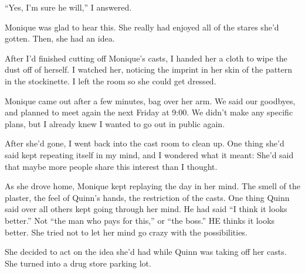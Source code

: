 ``Yes, I'm sure he will,'' I answered.

Monique was glad to hear this. She really had enjoyed all of the stares she'd gotten.
Then, she had an idea.

After I'd finished cutting off Monique's casts, I handed her a cloth to wipe the dust off
of herself. I watched her, noticing the imprint in her skin of the pattern in the stockinette. I
left the room so she could get dressed.

Monique came out after a few minutes, bag over her arm. We said our goodbyes, and planned
to meet again the next Friday at 9:00. We didn't make any specific plans, but I already knew I
wanted to go out in public again.

After she'd gone, I went back into the cast room to clean up. One thing she'd said kept
repeating itself in my mind, and I wondered what it meant: She'd said that maybe more people
share this interest than I thought.

\begin{thought}
As she drove home, Monique kept replaying the day in her mind. The smell of the plaster,
the feel of Quinn's hands, the restriction of the casts. One thing Quinn said over all others
kept going through her mind. He had said ``I think it looks better.'' Not ``the man who pays for
this,'' or ``the boss.'' HE thinks it looks better. She tried not to let her mind go crazy with
the possibilities.

She decided to act on the idea she'd had while Quinn was taking off her casts. She turned
into a drug store parking lot.
\end{thought}

